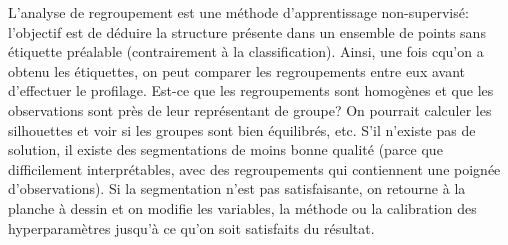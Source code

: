 \documentclass[
  11pt,
  letterpaper,
]{scrbook}
\theoremstyle{definition}
\theoremstyle{remark}
\begin{document}
L'analyse de regroupement est une méthode d'apprentissage non-supervisé:
l'objectif est de déduire la structure présente dans un ensemble de
points sans étiquette préalable (contrairement à la classification).
Ainsi, une fois cqu'on a obtenu les étiquettes, on peut comparer les
regroupements entre eux avant d'effectuer le profilage. Est-ce que les
regroupements sont homogènes et que les observations sont près de leur
représentant de groupe? On pourrait calculer les silhouettes et voir si
les groupes sont bien équilibrés, etc. S'il n'existe pas de solution, il
existe des segmentations de moins bonne qualité (parce que difficilement
interprétables, avec des regroupements qui contiennent une poignée
d'observations). Si la segmentation n'est pas satisfaisante, on retourne
à la planche à dessin et on modifie les variables, la méthode ou la
calibration des hyperparamètres jusqu'à ce qu'on soit satisfaits du
résultat.
\end{document}
